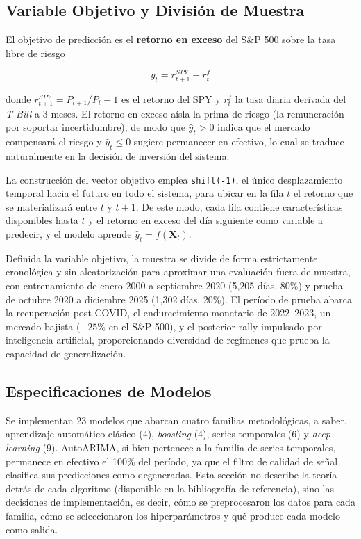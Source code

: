 ﻿\documentclass[11pt,a4paper]{article}
\begin{document}
\subsection{Variable Objetivo y Divisi\'on de Muestra}

El objetivo de predicci\'on es el \textbf{retorno en exceso} del S\&P 500 sobre la tasa libre de riesgo

\begin{equation}
y_t = r_{t+1}^{SPY} - r_t^{f}
\label{eq:target}
\end{equation}

\noindent donde $r_{t+1}^{SPY} = P_{t+1}/P_t - 1$ es el retorno del SPY y $r_t^{f}$ la tasa diaria derivada del \textit{T-Bill} a 3 meses. El retorno en exceso a\'isla la prima de riesgo (la remuneraci\'on por soportar incertidumbre), de modo que $\hat{y}_t > 0$ indica que el mercado compensar\'a el riesgo y $\hat{y}_t \leq 0$ sugiere permanecer en efectivo, lo cual se traduce naturalmente en la decisi\'on de inversi\'on del sistema.

La construcci\'on del vector objetivo emplea \texttt{shift(-1)}, el \'unico desplazamiento temporal hacia el futuro en todo el sistema, para ubicar en la fila $t$ el retorno que se materializar\'a entre $t$ y $t{+}1$. De este modo, cada fila contiene caracter\'isticas disponibles hasta $t$ y el retorno en exceso del d\'ia siguiente como variable a predecir, y el modelo aprende $\hat{y}_t = f(\mathbf{X}_t)$.

Definida la variable objetivo, la muestra se divide de forma estrictamente cronol\'ogica y sin aleatorizaci\'on para aproximar una evaluaci\'on fuera de muestra, con entrenamiento de enero 2000 a septiembre 2020 (5{,}205 d\'ias, 80\%) y prueba de octubre 2020 a diciembre 2025 (1{,}302 d\'ias, 20\%). El per\'iodo de prueba abarca la recuperaci\'on post-COVID, el endurecimiento monetario de 2022--2023, un mercado bajista ($-25\%$ en el S\&P 500), y el posterior rally impulsado por inteligencia artificial, proporcionando diversidad de reg\'imenes que prueba la capacidad de generalizaci\'on.

\subsection{Especificaciones de Modelos}

Se implementan 23 modelos que abarcan cuatro familias metodol\'ogicas, a saber, aprendizaje autom\'atico cl\'asico (4), \textit{boosting} (4), series temporales (6) y \textit{deep learning} (9). AutoARIMA, si bien pertenece a la familia de series temporales, permanece en efectivo el 100\% del per\'iodo, ya que el filtro de calidad de se\~nal clasifica sus predicciones como degeneradas. Esta secci\'on no describe la teor\'ia detr\'as de cada algoritmo (disponible en la bibliograf\'ia de referencia), sino las decisiones de implementaci\'on, es decir, c\'omo se preprocesaron los datos para cada familia, c\'omo se seleccionaron los hiperpar\'ametros y qu\'e produce cada modelo como salida.
\end{document}
